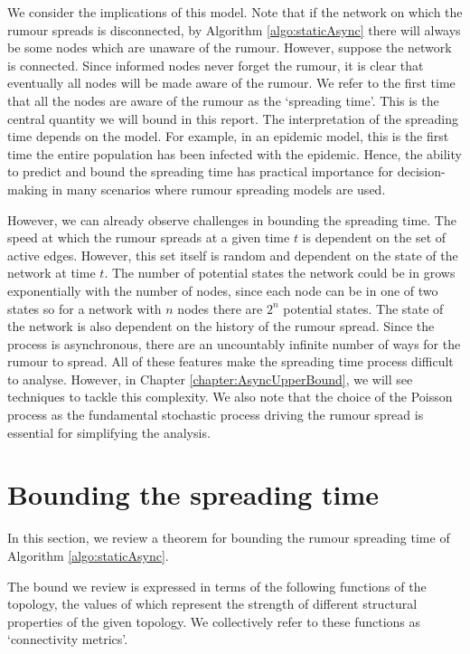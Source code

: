 We consider the implications of this model. 
Note that if the network on which the rumour spreads is disconnected, by Algorithm \ref{algo:staticAsync} there will always be some nodes which are unaware of the rumour. However, suppose the network is connected.
Since informed nodes never forget the rumour, it is clear that eventually all nodes will be made aware of the rumour. We refer to the first time that all the nodes are aware of the rumour as the `spreading time'. This is the central quantity we will bound in this report. The interpretation of the spreading time depends on the model. For example, in an epidemic model, this is the first time the entire population has been infected with the epidemic. Hence, the ability to predict and bound the spreading time has practical importance for decision-making in many scenarios where rumour spreading models are used.

However, we can already observe challenges in bounding the spreading time. The speed at which the rumour spreads at a given time $t$ is dependent on the set of active edges. However, this set itself is random and dependent on the state of the network at time $t$. The number of potential states the network could be in grows exponentially with the number of nodes, since each node can be in one of two states so for a network with $n$ nodes there are $2^n$ potential states. The state of the network is also dependent on the history of the rumour spread.
Since the process is asynchronous, there are an uncountably infinite number of ways for the rumour to spread. All of these features make the spreading time process difficult to analyse. However, in Chapter \ref{chapter:AsyncUpperBound}, we will see techniques to tackle this complexity. We also note that the choice of the Poisson process as the fundamental stochastic process driving the rumour spread is essential for simplifying the analysis.

\section{Bounding the spreading time}\label{section:graphMetrics}

In this section, we review a theorem for bounding the rumour spreading time of Algorithm \ref{algo:staticAsync}.

The bound we review is expressed in terms of the following functions of the topology, the values of which represent the strength of different structural properties of the given topology. We collectively refer to these functions as `connectivity metrics'.

